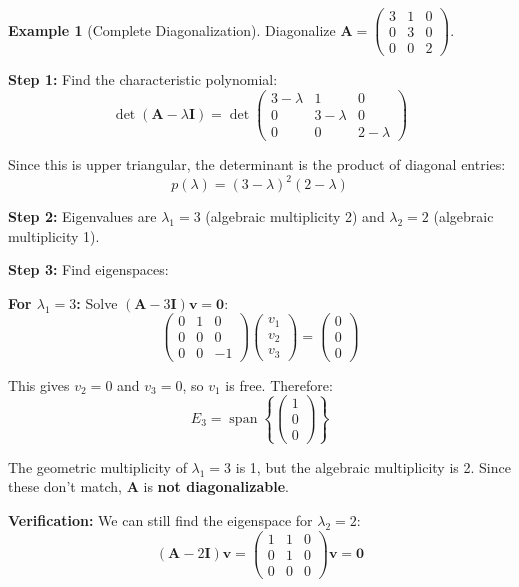 \documentclass[12pt]{article}
\numberwithin{equation}{section}
\newcommand{\vect}[1]{\boldsymbol{#1}}   %
\newcommand{\mat}[1]{\mathbf{#1}}        %
\newcommand{\Span}{\operatorname{span}}
\theoremstyle{plain}
\theoremstyle{definition}
\newtheorem{example}[theorem]{Example}
\theoremstyle{remark}
\begin{document}
\begin{example}[Complete Diagonalization]
Diagonalize $\mat{A} = \begin{pmatrix} 3 & 1 & 0 \\ 0 & 3 & 0 \\ 0 & 0 & 2 \end{pmatrix}$.

\textbf{Step 1:} Find the characteristic polynomial:
$$\det(\mat{A} - \lambda\mat{I}) = \det\begin{pmatrix} 3-\lambda & 1 & 0 \\ 0 & 3-\lambda & 0 \\ 0 & 0 & 2-\lambda \end{pmatrix}$$

Since this is upper triangular, the determinant is the product of diagonal entries:
$$p(\lambda) = (3-\lambda)^2(2-\lambda)$$

\textbf{Step 2:} Eigenvalues are $\lambda_1 = 3$ (algebraic multiplicity 2) and $\lambda_2 = 2$ (algebraic multiplicity 1).

\textbf{Step 3:} Find eigenspaces:

\textbf{For $\lambda_1 = 3$:} Solve $(\mat{A} - 3\mat{I})\vect{v} = \vect{0}$:
$$\begin{pmatrix} 0 & 1 & 0 \\ 0 & 0 & 0 \\ 0 & 0 & -1 \end{pmatrix}\begin{pmatrix} v_1 \\ v_2 \\ v_3 \end{pmatrix} = \begin{pmatrix} 0 \\ 0 \\ 0 \end{pmatrix}$$

This gives $v_2 = 0$ and $v_3 = 0$, so $v_1$ is free. Therefore:
$$E_3 = \Span\left\{\begin{pmatrix} 1 \\ 0 \\ 0 \end{pmatrix}\right\}$$

The geometric multiplicity of $\lambda_1 = 3$ is 1, but the algebraic multiplicity is 2. Since these don't match, $\mat{A}$ is \textbf{not diagonalizable}.

\textbf{Verification:} We can still find the eigenspace for $\lambda_2 = 2$:
$$(\mat{A} - 2\mat{I})\vect{v} = \begin{pmatrix} 1 & 1 & 0 \\ 0 & 1 & 0 \\ 0 & 0 & 0 \end{pmatrix}\vect{v} = \vect{0}$$


\end{example}
\end{document}

